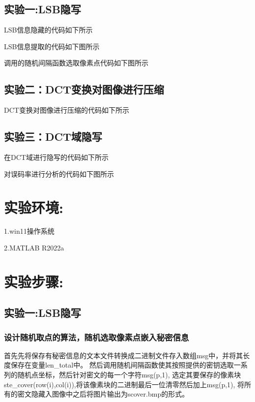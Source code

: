 \documentclass[a4paper,11pt,UTF8]{ctexart}
\begin{document}
  \subsection{实验一:LSB隐写}
    LSB信息隐藏的代码如下所示
    
    LSB信息提取的代码如下图所示
    
    调用的随机间隔函数选取像素点代码如下图所示
    
      
  \subsection{实验二：DCT变换对图像进行压缩}
    DCT变换对图像进行压缩的代码如下所示
    

  \subsection{实验三：DCT域隐写}
    在DCT域进行隐写的代码如下所示
    

    对误码率进行分析的代码如下图所示
    

\section{实验环境:}
  1.win11操作系统\par
  2.MATLAB R2022a

\section{实验步骤:}

  \subsection{实验一:LSB隐写}
    \subsubsection{设计随机取点的算法，随机选取像素点嵌入秘密信息}
      首先先将保存有秘密信息的文本文件转换成二进制文件存入数组msg中，并将其长度保存在变量len\_total中。
      然后调用随机间隔函数使其按照提供的密钥选取一系列的随机点坐标，然后针对密文的每一个字符msg(p,1),
      选定其要保存的像素块ste\_cover(row(i),col(i)),将该像素块的二进制最后一位清零然后加上msg(p,1),
      将所有的密文隐藏入图像中之后将图片输出为scover.bmp的形式。
\end{document}
